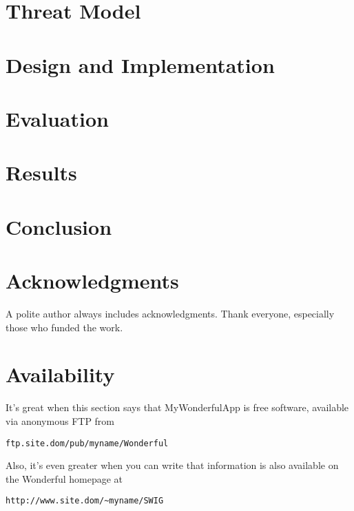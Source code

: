 \documentclass[letterpaper,twocolumn,10pt]{article}
\begin{document}
\section{Threat Model}


\section{Design and Implementation}


\section{Evaluation}


\section{Results}


\section{Conclusion}


\section{Acknowledgments}

A polite author always includes acknowledgments. Thank everyone, especially those who funded the work. 

\section{Availability}

It's great when this section says that MyWonderfulApp is free software, available via anonymous FTP from

\begin{center}
{\tt ftp.site.dom/pub/myname/Wonderful}\\
\end{center}

Also, it's even greater when you can write that information is also available on the Wonderful homepage at 

\begin{center}
{\tt http://www.site.dom/\~{}myname/SWIG}
\end{center}

{\footnotesize  }

\end{document}
